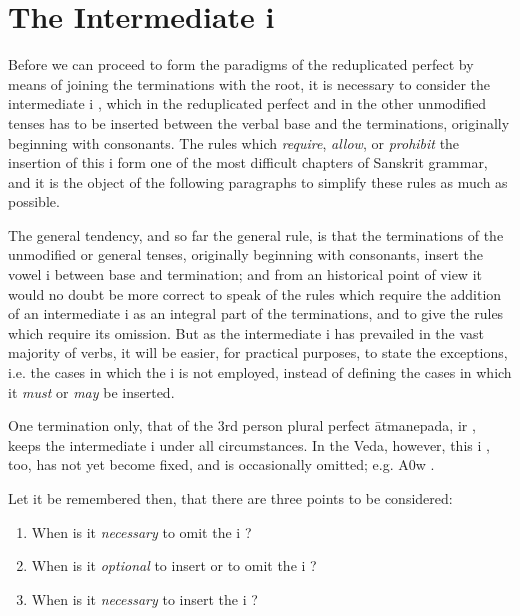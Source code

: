 \def\DevnagVersion{2.17}%
\chapter{The Intermediate {\dn i} }

\s Before we can proceed to form the paradigms of the reduplicated
perfect by means of joining the terminations with the root, it is
necessary to consider the intermediate {\dn i} , which in the
reduplicated perfect and in the other unmodified tenses has to be
inserted between the verbal base and the terminations, originally
beginning with consonants. The rules which \emph{require}, \emph{allow},
or \emph{prohibit} the insertion of this {\dn i}  form one of the most
difficult chapters of Sanskrit grammar, and it is the object of the
following paragraphs to simplify these rules as much as possible.

The general tendency, and so far the general rule, is that the
terminations of the unmodified or general tenses, originally beginning
with consonants, insert the vowel {\dn i}  between base and
termination; and from an historical point of view it would no doubt be
more correct to speak of the rules which require the addition of an
intermediate {\dn i}  as an integral part of the terminations, and to
give the rules which require its omission. But as the intermediate {\dn i}
 has prevailed in the vast majority of verbs, it will be easier,
for practical purposes, to state the exceptions, i.e. the cases in which
the {\dn i}  is not employed, instead of defining the cases in which
it \emph{must} or \emph{may} be inserted.

One termination only, that of the 3rd person plural perfect ātmanepada,
{\dn ir\?} , keeps the intermediate {\dn i}  under all
circumstances. In the Veda, however, this {\dn i} , too, has not yet
become fixed, and is occasionally omitted; e.g. {\dn {}\3A0w\?} .

Let it be remembered then, that there are three points to be considered:

\begin{enumerate}
\item When is it \emph{necessary} to omit the {\dn i} ?
\item When is it \emph{optional} to insert or to omit the {\dn i} ?
\item When is it \emph{necessary} to insert the {\dn i} ?
\end{enumerate}

